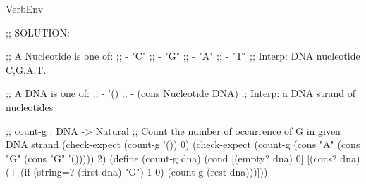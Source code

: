 \documentclass[12pt]{article}
\begin{document}
\begin{SaveVerbatim}{VerbEnv}

;; SOLUTION:
  
;; A Nucleotide is one of:
;; - "C"
;; - "G"
;; - "A"
;; - "T"
;; Interp: DNA nucleotide C,G,A,T.

;; A DNA is one of:
;; - '()
;; - (cons Nucleotide DNA)
;; Interp: a DNA strand of nucleotides

;; count-g : DNA -> Natural
;; Count the number of occurrence of G in given DNA strand
(check-expect (count-g '()) 0)
(check-expect (count-g (cons "A" (cons "G" (cons "G" '())))) 2)
(define (count-g dna)
  (cond [(empty? dna) 0]
        [(cons? dna)
         (+ (if (string=? (first dna) "G") 1 0)
            (count-g (rest dna)))]))

\end{SaveVerbatim}

  
\newpage








\end{document}
